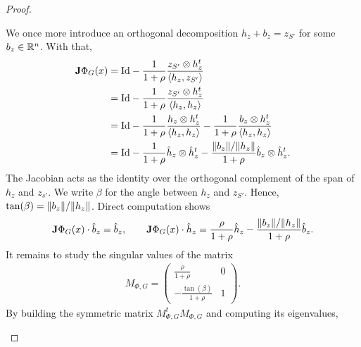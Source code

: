 \documentclass[10pt,a4paper]{article}
\begin{document}
\begin{proof}
\begin{itemize}
        We once more introduce an orthogonal decomposition $h_{z} + b_{z} = z_{S'}$ for some $b_{z} \in {\mathbb R}^{n}$.
        With that,
        \begin{align*}
            {\mathbf{J}} \Phi_{G}(x)
            &=
            {\rm Id} 
            - 
            \frac{ 1 }{ 1 + \rho }  
            \frac{ z_{S'} \otimes h_{z}^{t} }{ \langle h_{z},z_{S'}\rangle }  
            \\
            &=
            {\rm Id} 
            - 
            \frac{ 1 }{ 1 + \rho }  
            \frac{ z_{S'} \otimes h_{z}^{t} }{ \langle h_{z},h_{z}\rangle }  
            \\
            &=
            {\rm Id} 
            - 
            \frac{ 1 }{ 1 + \rho }  
            \frac{ h_{z} \otimes h_{z}^{t} }{ \langle h_{z},h_{z}\rangle } 
            - 
            \frac{ 1 }{ 1 + \rho }  
            \frac{ b_{z} \otimes h_{z}^{t} }{ \langle h_{z},h_{z}\rangle } 
            \\
            &=
            {\rm Id} 
            - 
            \frac{ 1 }{ 1 + \rho }  
            \hat h_{z} \otimes \hat h_{z}^{t}
            - 
            \frac{ \|  b_{z}  \| / \|  h_{z}  \| }{ 1 + \rho }  
            \hat b_{z} \otimes \hat h_{z}^{t}
            .
        \end{align*}
        The Jacobian acts as the identity over the orthogonal complement of the span of $h_{z}$ and $z_{s'}$.
        We write $\beta$ for the angle between $h_{z}$ and $z_{S'}$.
        Hence, $\tan(\beta) = \|  b_{z}  \| / \|  h_{z}  \|$. 
        Direct computation shows 
        \begin{align}
            {\mathbf{J}} \Phi_{G}(x) \cdot \hat b_{z} = \hat b_{z}
            ,
            \qquad 
            {\mathbf{J}} \Phi_{G}(x) \cdot \hat h_{z} = \frac{ \rho }{ 1 + \rho } \hat h_{z} - \frac{ \|  b_{z}  \| / \|  h_{z}  \| }{ 1 + \rho } \hat b_{z}
            .
        \end{align}
        It remains to study the singular values of the matrix 
        \begin{align*}
            M_{\Phi,G} 
            = 
            \begin{pmatrix}
                 \frac{ \rho }{ 1 + \rho }    & 0 
                \\
                -\frac{ \tan(\beta) }{1+\rho} & 1 
            \end{pmatrix}
            .
        \end{align*}
        By building the symmetric matrix $M_{\Phi,G}^{t} M_{\Phi,G}$ and computing its eigenvalues, 

\end{itemize}
\end{proof}
\end{document}
